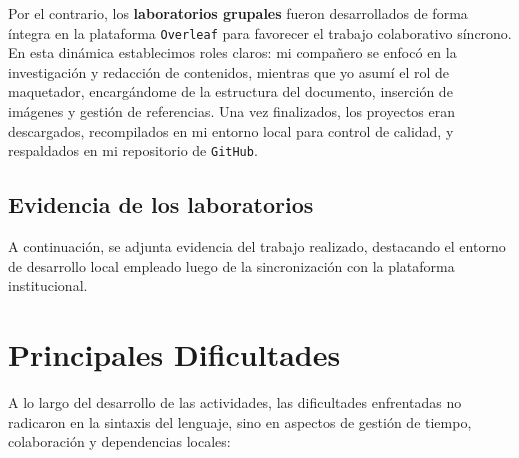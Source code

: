 Por el contrario, los \textbf{laboratorios grupales} fueron desarrollados de forma íntegra en la plataforma \texttt{Overleaf} para favorecer el trabajo colaborativo síncrono. En esta dinámica establecimos roles claros: mi compañero se enfocó en la investigación y redacción de contenidos, mientras que yo asumí el rol de maquetador, encargándome de la estructura del documento, inserción de imágenes y gestión de referencias. Una vez finalizados, los proyectos eran descargados, recompilados en mi entorno local para control de calidad, y respaldados en mi repositorio de \texttt{GitHub}.

\subsection{Evidencia de los laboratorios}

A continuación, se adjunta evidencia del trabajo realizado, destacando el entorno de desarrollo local empleado luego de la sincronización con la plataforma institucional.



\newpage
\section{Principales Dificultades}

A lo largo del desarrollo de las actividades, las dificultades enfrentadas no radicaron en la sintaxis del lenguaje, sino en aspectos de gestión de tiempo, colaboración y dependencias locales:

